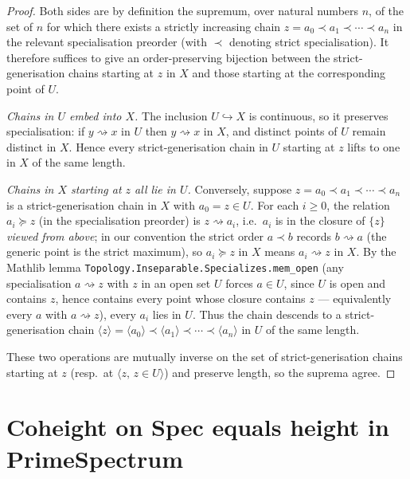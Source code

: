 \begin{proof}

\leanok
  Both sides are by definition the supremum, over natural numbers \(n\), of the
  set of \(n\) for which there exists a strictly increasing chain
  \(z = a_0 \prec a_1 \prec \cdots \prec a_n\) in the relevant
  specialisation preorder (with \(\prec\) denoting strict specialisation). It
  therefore suffices to give an order-preserving bijection between the
  strict-generisation chains starting at \(z\) in \(X\) and those starting at the
  corresponding point of \(U\).

  \emph{Chains in \(U\) embed into \(X\).} The inclusion \(U \hookrightarrow X\) is
  continuous, so it preserves specialisation: if \(y \rightsquigarrow x\) in \(U\)
  then \(y \rightsquigarrow x\) in \(X\), and distinct points of \(U\) remain
  distinct in \(X\). Hence every strict-generisation chain in \(U\) starting at
  \(z\) lifts to one in \(X\) of the same length.

  \emph{Chains in \(X\) starting at \(z\) all lie in \(U\).} Conversely, suppose
  \(z = a_0 \prec a_1 \prec \cdots \prec a_n\) is a strict-generisation chain
  in \(X\) with \(a_0 = z \in U\). For each \(i \geq 0\), the relation \(a_i \succeq
  z\) (in the specialisation preorder) is \(z \rightsquigarrow a_i\), i.e.\
  \(a_i\) is in the closure of \(\{z\}\) \emph{viewed from above}; in our
  convention the strict order \(a \prec b\) records \(b \rightsquigarrow a\)
  (the generic point is the strict maximum), so \(a_i \succeq z\) in \(X\) means
  \(a_i \rightsquigarrow z\) in \(X\). By the Mathlib lemma
  \texttt{Topology.Inseparable.Specializes.mem\_open} (any specialisation
  \(a \rightsquigarrow z\) with \(z\) in an open set \(U\) forces \(a \in U\), since
  \(U\) is open and contains \(z\), hence contains every point whose closure
  contains \(z\) --- equivalently every \(a\) with \(a \rightsquigarrow z\)),
  every \(a_i\) lies in \(U\). Thus the chain descends to a strict-generisation
  chain \(\langle z\rangle = \langle a_0\rangle \prec \langle a_1\rangle \prec
  \cdots \prec \langle a_n\rangle\) in \(U\) of the same length.

  These two operations are mutually inverse on the set of strict-generisation
  chains starting at \(z\) (resp.\ at \(\langle z, \, z \in U\rangle\)) and
  preserve length, so the suprema agree.
\end{proof}

\section{Coheight on Spec equals height in PrimeSpectrum}
\label{sec:coheight_spec_duality}

